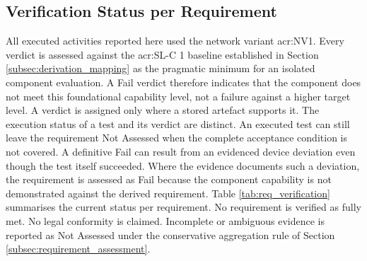 \subsection{Verification Status per Requirement}
\label{subsec:req_verification_table} 
All executed activities reported here used the network variant \gls{acr:NV1}. Every verdict is assessed against the \gls{acr:SL-C} 1 baseline established in Section \ref{subsec:derivation_mapping} as the pragmatic minimum for an isolated component evaluation. A Fail verdict therefore indicates that the component does not meet this foundational capability level, not a failure against a higher target level. A verdict is assigned only where a stored artefact supports it. The execution status of a test and its verdict are distinct. An executed test can still leave the requirement Not Assessed when the complete acceptance condition is not covered. A definitive Fail can result from an evidenced device deviation even though the test itself succeeded. Where the evidence documents such a deviation, the requirement is assessed as Fail because the component capability is not demonstrated against the derived requirement. Table \ref{tab:req_verification} summarises the current status per requirement. No requirement is verified as fully met. No legal conformity is claimed. Incomplete or ambiguous evidence is reported as Not Assessed under the conservative aggregation rule of Section \ref{subsec:requirement_assessment}.
